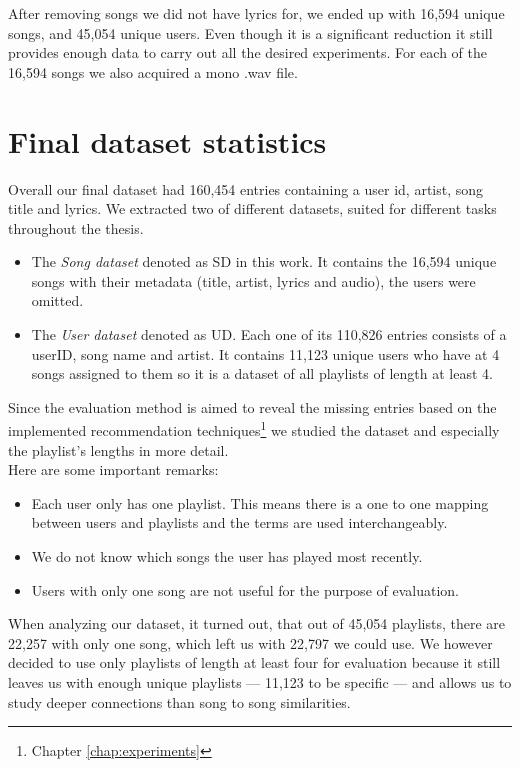 After removing songs we did not have lyrics for, we ended up with 16,594 unique songs, and 45,054 unique users. Even though it is a significant reduction it still provides enough data to carry out all the desired experiments. For each of the 16,594 songs we also acquired a mono .wav
file. 

\section{Final dataset statistics}
Overall our final dataset had 160,454 entries containing a user id, artist, song title and lyrics. We extracted two of different datasets, suited for different tasks throughout the thesis.
\begin{itemize}
    \item The \textit{Song dataset} denoted as SD in this work. It contains the
    16,594 unique songs with their metadata (title, artist, lyrics and audio), the users were omitted.
    \item The \textit{User dataset} denoted as UD.  Each one of its 110,826 entries consists of a userID, song name and artist. It contains 11,123 unique users who have at 4 songs assigned to them so it is a dataset of all playlists of length at least 4.
\end{itemize}
 Since the evaluation method is aimed to reveal the missing entries based on the
 implemented recommendation techniques\footnote{Chapter \ref{chap:experiments}} we studied the dataset and especially the playlist's
 lengths in more detail. \\
 
Here are some important remarks:
\begin{itemize}
    \item Each user only has one playlist. This means there is a one to one mapping between users and playlists and the terms are used interchangeably.
    \item We do not know which songs the user has played most recently.
    \item Users with only one song are not useful for the purpose of evaluation.
\end{itemize} 
When analyzing our dataset, it turned out, that out of 45,054 playlists, there are 22,257 with only one song, which left us with 22,797 we could use. We however decided to use only playlists of length at least four for evaluation because it still leaves us with enough unique playlists --- 11,123 to be specific --- and allows us to study deeper connections than song to song similarities. 

